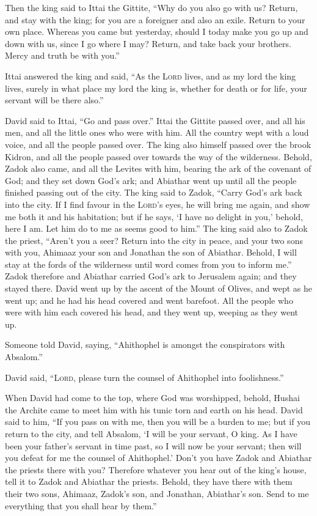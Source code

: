  Then the king said to Ittai the Gittite, ``Why do you
also go with us? Return, and stay with the king; for you are a foreigner
and also an exile. Return to your own place.  Whereas you
came but yesterday, should I today make you go up and down with us,
since I go where I may? Return, and take back your brothers. Mercy and
truth be with you.''

 Ittai answered the king and said, ``As the \textsc{Lord}
lives, and as my lord the king lives, surely in what place my lord the
king is, whether for death or for life, your servant will be there
also.''

 David said to Ittai, ``Go and pass over.'' Ittai the
Gittite passed over, and all his men, and all the little ones who were
with him.  All the country wept with a loud voice, and
all the people passed over. The king also himself passed over the brook
Kidron, and all the people passed over towards the way of the
wilderness.  Behold, Zadok also came, and all the Levites
with him, bearing the ark of the covenant of God; and they set down
God's ark; and Abiathar went up until all the people finished passing
out of the city.  The king said to Zadok, ``Carry God's
ark back into the city. If I find favour in the \textsc{Lord}'s eyes, he
will bring me again, and show me both it and his habitation;
 but if he says, `I have no delight in you,' behold, here
I am. Let him do to me as seems good to him.''  The king
said also to Zadok the priest, ``Aren't you a seer? Return into the city
in peace, and your two sons with you, Ahimaaz your son and Jonathan the
son of Abiathar.  Behold, I will stay at the fords of the
wilderness until word comes from you to inform me.'' 
Zadok therefore and Abiathar carried God's ark to Jerusalem again; and
they stayed there.  David went up by the ascent of the
Mount of Olives, and wept as he went up; and he had his head covered and
went barefoot. All the people who were with him each covered his head,
and they went up, weeping as they went up.

 Someone told David, saying, ``Ahithophel is amongst the
conspirators with Absalom.''

David said, ``\textsc{Lord}, please turn the counsel of Ahithophel into
foolishness.''

 When David had come to the top, where God was
worshipped, behold, Hushai the Archite came to meet him with his tunic
torn and earth on his head.  David said to him, ``If you
pass on with me, then you will be a burden to me;  but if
you return to the city, and tell Absalom, `I will be your servant, O
king. As I have been your father's servant in time past, so I will now
be your servant; then will you defeat for me the counsel of Ahithophel.'
 Don't you have Zadok and Abiathar the priests there with
you? Therefore whatever you hear out of the king's house, tell it to
Zadok and Abiathar the priests.  Behold, they have there
with them their two sons, Ahimaaz, Zadok's son, and Jonathan, Abiathar's
son. Send to me everything that you shall hear by them.''

